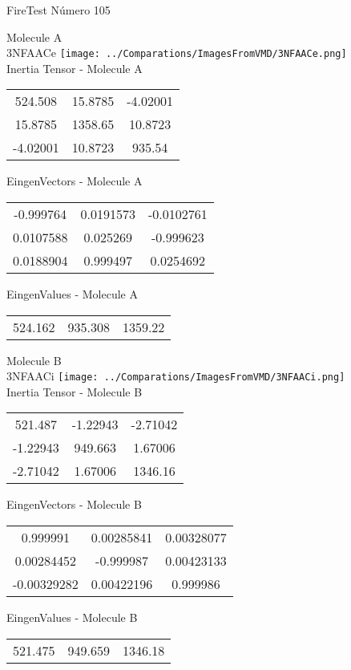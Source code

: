 \vtab[-2cm]
\begin{center}
{\large FireTest \tab Número 105}
\end{center}
\begin{multicols}{2}
\begin{center}

Molecule A \\ 
3NFAACe
\texttt{[image: ../Comparations/ImagesFromVMD/3NFAACe.png]}
\\
Inertia Tensor - Molecule A \\
\vtab

\begin{tabular}{|c c c|}
524.508	 & 	15.8785	 & 	-4.02001	 \\
15.8785	 & 	1358.65	 & 	10.8723	 \\
-4.02001	 & 	10.8723	 & 	935.54
\end{tabular}

\vtab
 EingenVectors - Molecule A     \\
\vtab
\begin{tabular}{|c c c|}
-0.999764	 & 	0.0191573	 & 	-0.0102761	 \\
0.0107588	 & 	0.025269	 & 	-0.999623	 \\
0.0188904	 & 	0.999497	 & 	0.0254692
\end{tabular}

\vtab
 EingenValues - Molecule A     \\
\vtab
\begin{tabular}{|c c c|}
524.162	 & 	935.308	 & 	1359.22	 \\
\end{tabular}
\columnbreak

Molecule B \\ 
3NFAACi
\texttt{[image: ../Comparations/ImagesFromVMD/3NFAACi.png]}
\\
Inertia Tensor - Molecule B \\
\vtab

\begin{tabular}{|c c c|}
521.487	 & 	-1.22943	 & 	-2.71042	 \\
-1.22943	 & 	949.663	 & 	1.67006	 \\
-2.71042	 & 	1.67006	 & 	1346.16
\end{tabular}

\vtab
 EingenVectors - Molecule B     \\
\vtab
\begin{tabular}{|c c c|}
0.999991	 & 	0.00285841	 & 	0.00328077	 \\
0.00284452	 & 	-0.999987	 & 	0.00423133	 \\
-0.00329282	 & 	0.00422196	 & 	0.999986
\end{tabular}

\vtab
 EingenValues - Molecule B     \\
\vtab
\begin{tabular}{|c c c|}
521.475	 & 	949.659	 & 	1346.18	 \\
\end{tabular}

\end{center}
\end{multicols}
